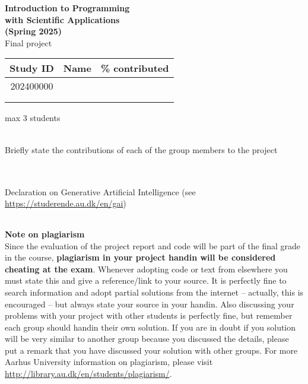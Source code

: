 \documentclass[a4paper, 11pt]{report}
\begin{document}

\thispagestyle{empty}
\setcounter{page}{0}

\begin{center}
  \huge
  \textbf{Introduction to Programming \\
  with Scientific Applications \\
  (Spring 2025)} \\[2ex]
  Final project \\[3ex]
\end{center}
\noindent
\begin{tabularx}{\textwidth}{|c|X|c|}
\multicolumn{1}{c}{Study ID} & 
\multicolumn{1}{l}{Name} & 
\multicolumn{1}{l}{\% contributed} \\
\hline
202400000 & & \\ %
\hline
& & \\ %
\hline
& & \\ %
\hline
\end{tabularx}
\centerline{max 3 students}
\\[2ex]
\noindent
Briefly state the contributions of each of the group members to the project
\\
\begin{tabularx}{\textwidth}{|X|}
\hline
\\[3cm]
\hline 
\end{tabularx}
\\[2ex]
\noindent
Declaration on Generative Artificial Intelligence (see \url{https://studerende.au.dk/en/gai})
\\
\begin{tabularx}{\textwidth}{|X|}
\hline
\\[3cm]
\hline 
\end{tabularx}


\vfill
\noindent
\textbf{Note on plagiarism} 
\\[2ex]
Since the evaluation of the project report and code will be part of the final grade in the course, \textbf{plagiarism in your project handin will be considered cheating at the exam}. Whenever adopting code or text from elsewhere you must state this and give a reference/link to your source. It is perfectly fine to search information and adopt partial solutions from the internet -- actually, this is encouraged -- but always state your source in your handin. Also discussing your problems with your project with other students is perfectly fine, but remember each group should handin their own solution. If you are in doubt if you solution will be very similar to another group because you discussed the details, please put a remark that you have discussed your solution with other groups. For more Aarhus University information on plagiarism, please visit \url{http://library.au.dk/en/students/plagiarism/}.

\newpage


\end{document}
